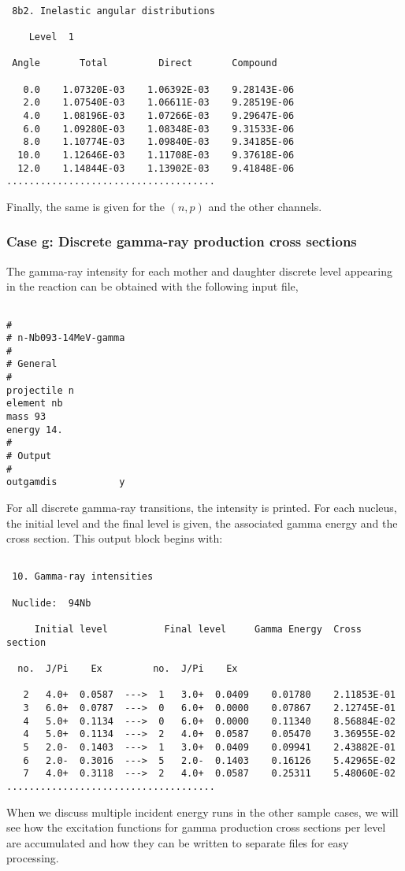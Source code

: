 \begin{samplecase}
{\small \begin{verbatim}

 8b2. Inelastic angular distributions    
   
    Level  1
   
 Angle       Total         Direct       Compound
  
   0.0    1.07320E-03    1.06392E-03    9.28143E-06
   2.0    1.07540E-03    1.06611E-03    9.28519E-06
   4.0    1.08196E-03    1.07266E-03    9.29647E-06
   6.0    1.09280E-03    1.08348E-03    9.31533E-06
   8.0    1.10774E-03    1.09840E-03    9.34185E-06
  10.0    1.12646E-03    1.11708E-03    9.37618E-06
  12.0    1.14844E-03    1.13902E-03    9.41848E-06
.....................................
\end{verbatim} } \renewcommand{\baselinestretch}{1.07}\small\normalsize
\noindent
Finally, the same is given for the $(n,p)$ and the other channels.
\subsubsection{Case g: Discrete gamma-ray production cross sections}
The gamma-ray intensity for each mother and daughter discrete level appearing 
in the reaction can be obtained with the following input file,

{\small \begin{verbatim}

#
# n-Nb093-14MeV-gamma
#
# General
#
projectile n
element nb
mass 93
energy 14.
#
# Output
#
outgamdis           y
\end{verbatim} } \renewcommand{\baselinestretch}{1.07}\small\normalsize
\noindent
For all discrete gamma-ray transitions, the intensity is printed.
For each nucleus, the initial level and the final level is given, the 
associated gamma energy and the cross section.
This output block begins with:  

{\small \begin{verbatim}

 10. Gamma-ray intensities

 Nuclide:  94Nb

     Initial level          Final level     Gamma Energy  Cross section

  no.  J/Pi    Ex         no.  J/Pi    Ex

   2   4.0+  0.0587  --->  1   3.0+  0.0409    0.01780    2.11853E-01
   3   6.0+  0.0787  --->  0   6.0+  0.0000    0.07867    2.12745E-01
   4   5.0+  0.1134  --->  0   6.0+  0.0000    0.11340    8.56884E-02
   4   5.0+  0.1134  --->  2   4.0+  0.0587    0.05470    3.36955E-02
   5   2.0-  0.1403  --->  1   3.0+  0.0409    0.09941    2.43882E-01
   6   2.0-  0.3016  --->  5   2.0-  0.1403    0.16126    5.42965E-02
   7   4.0+  0.3118  --->  2   4.0+  0.0587    0.25311    5.48060E-02
.....................................
\end{verbatim} } \renewcommand{\baselinestretch}{1.07}\small\normalsize
\noindent
When we discuss multiple incident energy runs in the other sample cases, 
we will see 
how the excitation functions for gamma production cross sections per level are
accumulated and how they can be written to separate files for easy processing.

\end{samplecase}
